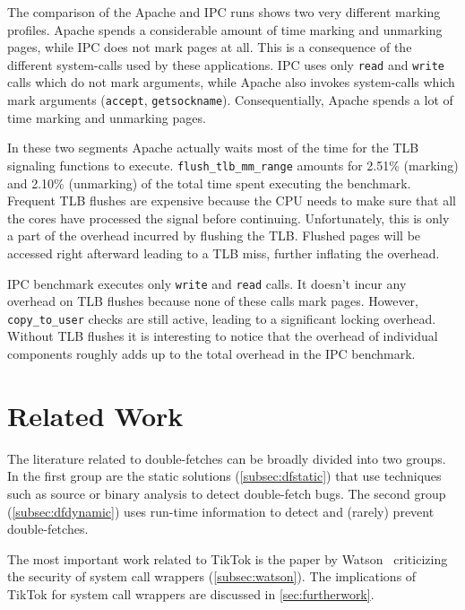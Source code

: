 \documentclass[conference]{IEEEtran}
\newcommand{\sysname}{TikTok}
\begin{document}
The comparison of the Apache and IPC runs shows two very different marking
profiles. Apache spends a considerable amount of time marking and unmarking
pages, while IPC does not mark pages at all. This is a consequence of the
different system-calls used by these applications. IPC uses only \texttt{read}
and \texttt{write} calls which do not mark arguments, while Apache also invokes
system-calls which mark arguments (\texttt{accept}, \texttt{getsockname}).
Consequentially, Apache spends a lot of time marking and unmarking pages.

In these two segments Apache actually waits most of the time for the TLB
signaling functions to execute. \texttt{flush\_tlb\_mm\_range} amounts for
2.51\% (marking) and 2.10\% (unmarking) of the total time spent executing the
benchmark. Frequent TLB flushes are expensive because the CPU needs to make sure
that all the cores have processed the signal before continuing. Unfortunately,
this is only a part of the overhead incurred by flushing the TLB. Flushed pages
will be accessed right afterward leading to a TLB miss, further inflating the
overhead.

IPC benchmark executes only \texttt{write} and \texttt{read} calls. It doesn't
incur any overhead on TLB flushes because none of these calls mark pages.
However, \texttt{copy\_to\_user} checks are still active, leading to a
significant locking overhead. Without TLB flushes it is interesting to notice
that the overhead of individual components roughly adds up to the total overhead
in the IPC benchmark.


\section{Related Work}
\label{sec:relatedwork}

The literature related to double-fetches can be broadly divided into two groups.
In the first group are the static solutions (\autoref{subsec:dfstatic}) that use
techniques such as source or binary analysis to detect double-fetch bugs. The
second group (\autoref{subsec:dfdynamic}) uses run-time information to detect
and (rarely) prevent double-fetches.

The most important work related to \sysname{} is the paper by
Watson~\cite{watson2007exploiting} criticizing the security of system call
wrappers (\autoref{subsec:watson}). The implications of \sysname{} for system
call wrappers are discussed in \autoref{sec:furtherwork}.
\end{document}
